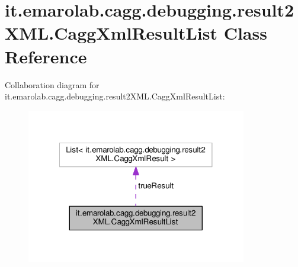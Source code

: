 \hypertarget{classit_1_1emarolab_1_1cagg_1_1debugging_1_1result2XML_1_1CaggXmlResultList}{\section{it.\-emarolab.\-cagg.\-debugging.\-result2\-X\-M\-L.\-Cagg\-Xml\-Result\-List Class Reference}
\label{classit_1_1emarolab_1_1cagg_1_1debugging_1_1result2XML_1_1CaggXmlResultList}
}


Collaboration diagram for it.\-emarolab.\-cagg.\-debugging.\-result2\-X\-M\-L.\-Cagg\-Xml\-Result\-List\-:\nopagebreak
\begin{figure}[H]
\begin{center}
\leavevmode
\includegraphics[width=272pt]{classit_1_1emarolab_1_1cagg_1_1debugging_1_1result2XML_1_1CaggXmlResultList__coll__graph}
\end{center}
\end{figure}
